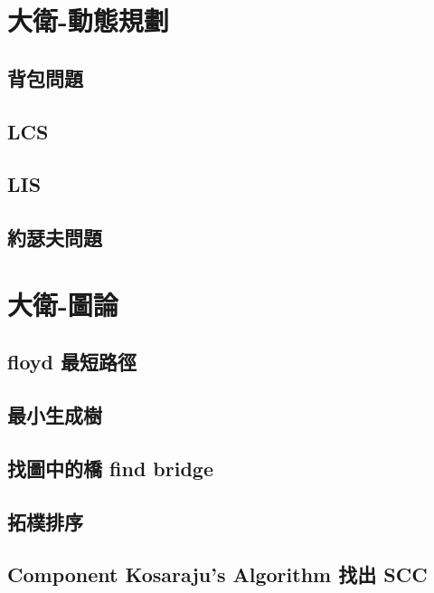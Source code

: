 \section{大衛-動態規劃}
\subsection{背包問題}
\raggedbottom
\hrulefill
\subsection{LCS}
\raggedbottom
\hrulefill
\subsection{LIS}
\raggedbottom
\hrulefill
\subsection{約瑟夫問題}
\raggedbottom
\hrulefill

\section{大衛-圖論}
\subsection{floyd 最短路徑}
\raggedbottom
\hrulefill
\subsection{最小生成樹}
\raggedbottom
\hrulefill
\subsection{找圖中的橋 find bridge}
\raggedbottom
\hrulefill
\subsection{拓樸排序}
\raggedbottom
\hrulefill
\subsection{Component Kosaraju's Algorithm 找出 SCC}
\raggedbottom
\hrulefill

